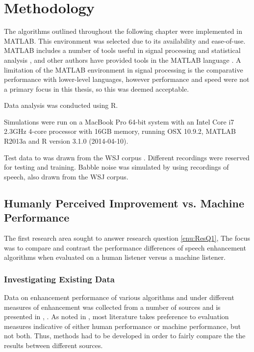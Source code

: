 
\chapter{Methodology}

\acresetall

The algorithms outlined throughout the following chapter were implemented
in MATLAB. This environment was selected due to its availability and
ease-of-use. MATLAB includes a number of tools useful in signal processing
and statistical analysis \citep{Krauss1994,Jones1997}, and other
authors have provided tools in the MATLAB language \citep{Hoyer2004,Brookes1997,Loizou2008,Wojcicki2011}.
A limitation of the MATLAB environment in signal processing is the
comparative performance with lower-level languages, however performance
and speed were not a primary focus in this thesis, so this was deemed
acceptable.

Data analysis was conducted using R.

Simulations were run on a MacBook Pro 64-bit system with an Intel
Core i7 2.3GHz 4-core processor with 16GB memory, running OSX 10.9.2,
MATLAB R2013a and R version 3.1.0 (2014-04-10).

Test data to was drawn from the \ac{WSJ} corpus \citep{Robinson1995}.
Different recordings were reserved for testing and training. Babble
noise was simulated by using recordings of speech, also drawn from
the \ac{WSJ} corpus.


\section{Humanly Perceived Improvement vs. Machine Performance}

The first research area sought to answer research question \vref{enu:ResQ1},
\textit{\RQone{}} The focus was to compare and contrast the performance
differences of speech enhancement algorithms when evaluated on a human
listener versus a machine listener.


\subsection{\label{sub:Method-Existing-Data}Investigating Existing Data}

Data on enhancement performance of various algorithms and under different
measures of enhancement was collected from a number of sources \citep{mohammadiha2013supervised,Wilson2008,Schmidt2006,Raj2005,Rennie2008,Weninger2011,Williamson2014,Paliwal2010,Plourde2007}
and is presented in , . As
noted in  \textit{},
most literature takes preference to evaluation measures indicative
of either human performance or machine performance, but not both.
Thus, methods had to be developed in order to fairly compare the the
results between different sources.

